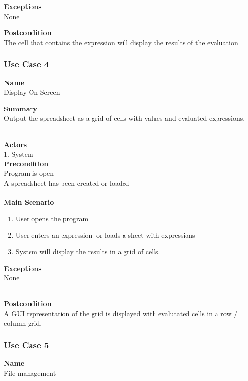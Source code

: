 \documentclass[12pt]{article}
\begin{document}
\noindent
{\bf Exceptions}\\
None

\noindent
{\bf Postcondition}\\
The cell that contains the expression will display the results of the evaluation

\clearpage

\subsubsection{Use Case 4} \label{uc:4}

\noindent
{\bf Name}\\
Display On Screen

\noindent
{\bf Summary}\\
Output the spreadsheet as a grid of cells with values and evaluated expressions.

\noindent\\
{\bf Actors}\\
1. System\\

\noindent
{\bf Precondition}\\
Program is open\\
A spreadsheet has been created or loaded\\
\noindent\\
{\bf Main Scenario}\\
\vspace*{-0.2in}
\begin{enumerate}
\item User opens the program
\item User enters an expression, or loads a sheet with expressions
\item System will display the results in a grid of cells.
\end{enumerate}

\noindent
{\bf Exceptions}\\
None

\noindent\\
{\bf Postcondition}\\
A GUI representation of the grid is displayed with evalutated cells in a row / column grid.

\clearpage


\subsubsection{Use Case 5} \label{uc:5}

\noindent
{\bf Name}\\
File management
\end{document}
